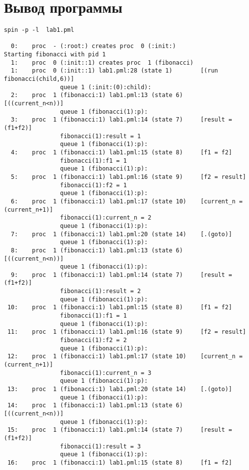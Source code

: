 \documentclass[a4paper,12pt]{report}
\begin{document}
\section*{Вывод программы}
\begin{Verbatim}
spin -p -l  lab1.pml

  0:    proc  - (:root:) creates proc  0 (:init:)
Starting fibonacci with pid 1
  1:    proc  0 (:init::1) creates proc  1 (fibonacci)
  1:    proc  0 (:init::1) lab1.pml:28 (state 1)        [(run fibonacci(child,6))]
                queue 1 (:init:(0):child): 
  2:    proc  1 (fibonacci:1) lab1.pml:13 (state 6)     [((current_n<n))]
                queue 1 (fibonacci(1):p): 
  3:    proc  1 (fibonacci:1) lab1.pml:14 (state 7)     [result = (f1+f2)]
                fibonacci(1):result = 1
                queue 1 (fibonacci(1):p): 
  4:    proc  1 (fibonacci:1) lab1.pml:15 (state 8)     [f1 = f2]
                fibonacci(1):f1 = 1
                queue 1 (fibonacci(1):p): 
  5:    proc  1 (fibonacci:1) lab1.pml:16 (state 9)     [f2 = result]
                fibonacci(1):f2 = 1
                queue 1 (fibonacci(1):p): 
  6:    proc  1 (fibonacci:1) lab1.pml:17 (state 10)    [current_n = (current_n+1)]
                fibonacci(1):current_n = 2
                queue 1 (fibonacci(1):p): 
  7:    proc  1 (fibonacci:1) lab1.pml:20 (state 14)    [.(goto)]
                queue 1 (fibonacci(1):p): 
  8:    proc  1 (fibonacci:1) lab1.pml:13 (state 6)     [((current_n<n))]
                queue 1 (fibonacci(1):p): 
  9:    proc  1 (fibonacci:1) lab1.pml:14 (state 7)     [result = (f1+f2)]
                fibonacci(1):result = 2
                queue 1 (fibonacci(1):p): 
 10:    proc  1 (fibonacci:1) lab1.pml:15 (state 8)     [f1 = f2]
                fibonacci(1):f1 = 1
                queue 1 (fibonacci(1):p): 
 11:    proc  1 (fibonacci:1) lab1.pml:16 (state 9)     [f2 = result]
                fibonacci(1):f2 = 2
                queue 1 (fibonacci(1):p): 
 12:    proc  1 (fibonacci:1) lab1.pml:17 (state 10)    [current_n = (current_n+1)]
                fibonacci(1):current_n = 3
                queue 1 (fibonacci(1):p): 
 13:    proc  1 (fibonacci:1) lab1.pml:20 (state 14)    [.(goto)]
                queue 1 (fibonacci(1):p): 
 14:    proc  1 (fibonacci:1) lab1.pml:13 (state 6)     [((current_n<n))]
                queue 1 (fibonacci(1):p): 
 15:    proc  1 (fibonacci:1) lab1.pml:14 (state 7)     [result = (f1+f2)]
                fibonacci(1):result = 3
                queue 1 (fibonacci(1):p): 
 16:    proc  1 (fibonacci:1) lab1.pml:15 (state 8)     [f1 = f2]

\end{Verbatim}
\end{document}
